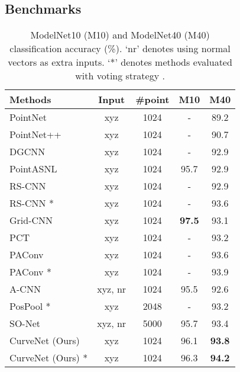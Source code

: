 \documentclass[10pt,twocolumn,letterpaper]{article}
\theoremstyle{definition}
\begin{document}
\subsection{Benchmarks}

\begin{table} 
	\begin{center}
	\caption{ModelNet10 (M10) and ModelNet40
(M40) classification accuracy (\%). `nr' denotes using normal vectors as extra inputs. `*' denotes methods evaluated with voting strategy \cite{liu2019relation}. }
		\begin{tabular}{l|cccc} 
			\toprule 
			Methods & Input & \#point & M10 & M40\\
			\hline
			\hline
			PointNet \cite{qi2017pointnet} & xyz & 1024 & - & 89.2\\
			PointNet++ \cite{qi2017pointnet++} & xyz & 1024 & - & 90.7\\
			DGCNN \cite{wang2019dynamic} & xyz & 1024 & - & 92.9 \\
PointASNL \cite{yan2020pointasnl} & xyz & 1024 & 95.7 & 92.9\\
RS-CNN \cite{liu2019relation} & xyz & 1024 & - & 92.9 \\
			RS-CNN \cite{liu2019relation} * & xyz & 1024 & - & 93.6 \\
			Grid-CNN \cite{xu2020grid} & xyz & 1024 &  \textbf{97.5} & 93.1 \\
PCT \cite{guo2020pct} & xyz & 1024 & - & 93.2 \\
			PAConv \cite{xu2021paconv} & xyz & 1024 & - & 93.6 \\
			PAConv \cite{xu2021paconv} * & xyz & 1024 & - & 93.9 \\
\hline
			A-CNN \cite{komarichev2019cnn} & xyz, nr & 1024 & 95.5 & 92.6\\
			PosPool \cite{liu2020closer} *& xyz & 2048 & - & 93.2 \\


			SO-Net \cite{li2018so} & xyz, nr & 5000 & 95.7 & 93.4\\
			\hline
CurveNet (Ours) & xyz & 1024 & 96.1 & \textbf{93.8}\\
CurveNet (Ours) * & xyz & 1024 & 96.3 & \textbf{94.2}\\
			\bottomrule
		\end{tabular}
		
		\label{table:modelnet}

	\end{center}
	\vspace{-1em}
\end{table} 
\end{document}
